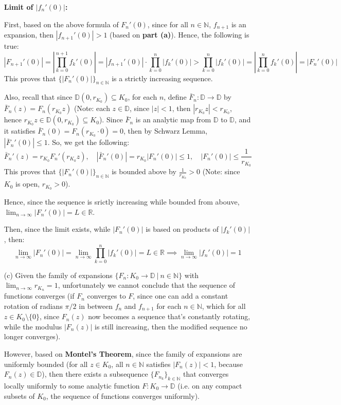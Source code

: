 \documentclass{article}
\begin{document}
\begin{itemize}
    \textbf{Limit of $|f_n'(0)|$:}

    First, based on the above formula of $F_n'(0)$, since for all $n\in\mathbb{N}$, $f_{n+1}$ is an expansion, then $|f_{n+1}'(0)|>1$ (based on \textbf{part (a)}). Hence, the following is true:
    $$|F_{n+1}'(0)|=\left|\prod_{k=0}^{n+1}f_k'(0)\right| = |f_{n+1}'(0)|\cdot\prod_{k=0}^{n}|f_k'(0)| > \prod_{k=0}^{n}|f_k'(0)| = \left|\prod_{k=0}^{n}f_k'(0)\right|=|F_n'(0)|$$
    This proves that $\{|F_{n}'(0)|\}_{n\in\mathbb{N}}$ is a strictly increasing sequence.

    Also, recall that since $\mathbb{D}(0,r_{K_0})\subseteq K_0$, for each $n$, define $\bar{F}_n:\mathbb{D}\rightarrow\mathbb{D}$ by $\bar{F}_n(z)=F_n(r_{K_0}z)$ (Note: each $z\in \mathbb{D}$, since $|z|<1$, then $|r_{K_0}z|<r_{K_0}$, hence $r_{K_0}z\in \mathbb{D}(0,r_{K_0})\subseteq K_0$).
    Since $\bar{F}_n$ is an analytic map from $\mathbb{D}$ to $\mathbb{D}$, and it satisfies $\bar{F}_n(0)=F_n(r_{K_0}\cdot 0)=0$, then by Schwarz Lemma, $|\bar{F}_n'(0)|\leq 1$. So, we get the following:
    $$\bar{F}_n'(z)=r_{K_0}F_n'(r_{K_0}z),\quad |\bar{F}_n'(0)|=r_{K_0}|F_n'(0)| \leq 1,\quad |F_n'(0)|\leq \frac{1}{r_{K_0}}$$
    This proves that $\{|F_{n}'(0)|\}_{n\in\mathbb{N}}$ is bounded above by $\frac{1}{r_{K_0}}>0$ (Note: since $K_0$ is open, $r_{K_0}>0$).

    Hence, since the sequence is srictly increasing while bounded from abouve, $\lim_{n\rightarrow \infty}|F_n'(0)|=L\in\mathbb{R}$.

    Then, since the limit exists, while $|F_n'(0)|$ is based on products of $|f_k'(0)|$, then:
    $$\lim_{n\rightarrow\infty}|F_n'(0)|=\lim_{n\rightarrow\infty}\prod_{k=0}^{n}|f_k'(0)|=L\in\mathbb{R} \implies \lim_{n\rightarrow\infty}|f_n'(0)|=1$$

    \hfil

    \item[(c)] Given the family of expansions $\{F_n:K_0\rightarrow\mathbb{D}\ |\ n\in\mathbb{N}\}$ with $\lim_{n\rightarrow\infty}r_{K_n}=1$, unfortunately we cannot conclude that the sequence of functions converges (if $F_n$ converges to $F$, since one can add a constant rotation of radians $\pi/2$ in between $f_n$ and $f_{n+1}$ for each $n\in\mathbb{N}$,
    which for all $z\in K_0\setminus\{0\}$, since $F_n(z)$ now becomes a sequence that's constantly rotating, while the modulus $|F_n(z)|$ is still increasing, then the modified sequence no longer converges).

    However, based on \textbf{Montel's Theorem}, since the family of expansions are uniformly bounded (for all $z\in K_0$, all $n\in\mathbb{N}$ satisfies $|F_n(z)|<1$, because $F_n(z)\in\mathbb{D}$), then there exists a subsequence $\{F_{n_k}\}_{k\in\mathbb{N}}$ that converges locally uniformly to some analytic function $F:K_0\rightarrow\mathbb{D}$ (i.e. on any compact subsets of $K_0$, the sequence of functions converges uniformly).
    

\end{itemize}
\end{document}
